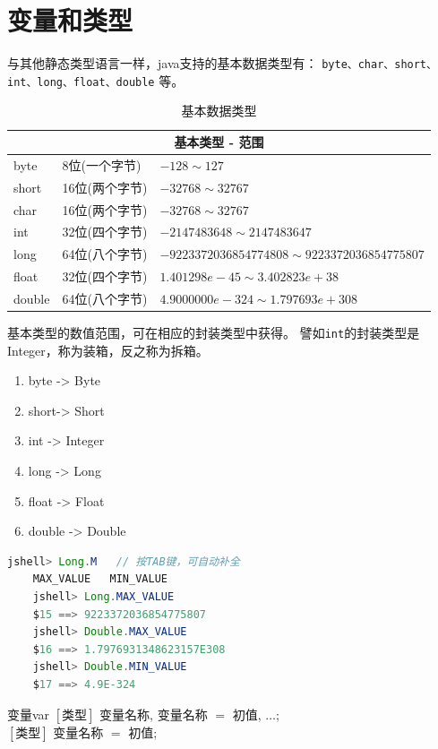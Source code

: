 \section{变量和类型}
与其他静态类型语言一样，java支持的基本数据类型有：
\lstinline{byte、char、short、int、long、float、double}
等。

\begin{table}[!htbp] \centering \small
\begin{tabular}{|p{1cm}|p{3cm}|p{9cm}|}
\toprule
	\multicolumn{3}{|c|}{基本类型 - 范围}\\
\midrule
	byte&8位(一个字节)&$-128\sim127$\\
	short&16位(两个字节)&$-32768\sim32767$\\
	char&16位(两个字节)&$-32768\sim32767$\\
	int&32位(四个字节)&$-2147483648\sim2147483647$\\
	long&64位(八个字节)&$-9223372036854774808\sim9223372036854775807$\\
	float&32位(四个字节)&$1.401298e-45\sim3.402823e+38$\\
	double&64位(八个字节)&$4.9000000e-324\sim1.797693e+308$\\
\bottomrule
\end{tabular}
	\caption{基本数据类型}
\end{table}

基本类型的数值范围，可在相应的封装类型中获得。
譬如\lstinline{int}的封装类型是Integer，称为装箱，反之称为拆箱。
\begin{enumerate}
	\item byte -> Byte
	\item short-> Short
	\item int -> Integer
	\item long -> Long
	\item float -> Float
	\item double -> Double
\end{enumerate}

\begin{lstlisting}[language=Java, backgroundcolor=\color{lightgray!10}]
	jshell> Long.M   // 按TAB键，可自动补全
	MAX_VALUE   MIN_VALUE   
	jshell> Long.MAX_VALUE
	$15 ==> 9223372036854775807
	jshell> Double.MAX_VALUE
	$16 ==> 1.7976931348623157E308
	jshell> Double.MIN_VALUE
	$17 ==> 4.9E-324
\end{lstlisting}

\begin{definition}{变量}{var}
	$[\text{类型}]$ 变量名称, 变量名称 $=$ 初值, $\dots$;\\
	$[\text{类型}]$ 变量名称 $=$ 初值;
\end{definition}


